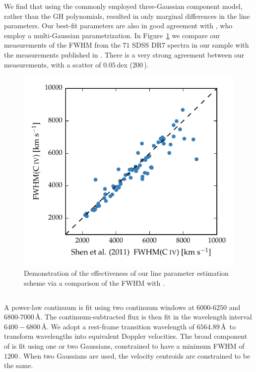 We find that using the commonly employed three-Gaussian component model, rather than the GH polynomials, resulted in only marginal differences in the line parameters. 
Our best-fit parameters are also in good agreement with \citet{shen11}, who employ a multi-Gaussian parametrization. 
In Figure~\ref{fig:shen_comparison_civ} we compare our measurements of the  FWHM from the $71$ SDSS DR$7$ spectra in our sample with the measurements published in \citet{shen11}. 
There is a very strong agreement between our measurements, with a scatter of $0.05$\,dex ($200$\,\kms). 

\begin{figure}
    \centering 
    \includegraphics[width=0.8\linewidth]{figures/chapter03/shen_comparison_civ.pdf} 
    \caption{Demonstration of the effectiveness of our line parameter estimation scheme via a comparison of the  FWHM with \citet{shen11}.} 
    \label{fig:shen_comparison_civ}
\end{figure}

\subsection{\ha}
\label{sec:ha}


A power-law continuum is fit using two continuum windows at $6000$-$6250$ and $6800$-$7000$\,\AA. 
The continuum-subtracted flux is then fit in the wavelength interval $6400-6800$\,\AA. 
We adopt a rest-frame transition wavelength of $6564.89$\,\AA\, to transform wavelengths into equivalent Doppler velocities. 
The broad component of \ha is fit using one or two Gaussians, constrained to have a minimum FWHM of $1200$\,\kms. When two Gaussians are used, the velocity centroids are constrained to be the same.

